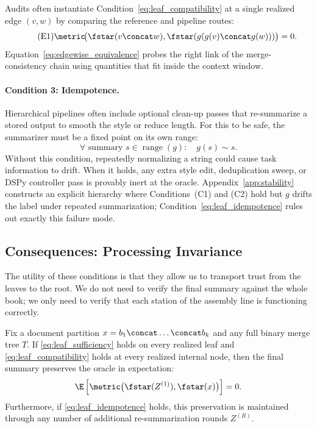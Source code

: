 \begin{remark}\label{rem:edgewise_compatibility}
Audits often instantiate Condition~\eqref{eq:leaf_compatibility} at a single realized edge $(v, w)$ by comparing the reference and pipeline routes:
\begin{equation}\tag{E1}\label{eq:edgewise_equivalence}
\metric\!\big(\fstar(v \concat w), \fstar(g(g(v) \concat g(w)))\big) = 0.
\end{equation}
Equation~\eqref{eq:edgewise_equivalence} probes the right link of the merge-consistency chain using quantities that fit inside the context window.
\end{remark}

\paragraph{Condition 3: Idempotence.}
Hierarchical pipelines often include optional clean-up passes that re-summarize a stored output to smooth the style or reduce length. For this to be safe, the summarizer must be a fixed point on its own range:
\begin{equation}\tag{C3}\label{eq:leaf_idempotence}
\forall \text{ summary } s \in \operatorname{range}(g):\quad g(s) \sim s.
\end{equation}
Without this condition, repeatedly normalizing a string could cause task information to drift. When it holds, any extra style edit, deduplication sweep, or DSPy controller pass is provably inert at the oracle. Appendix~\ref{app:stability} constructs an explicit hierarchy where Conditions~(C1) and (C2) hold but $g$ drifts the label under repeated summarization; Condition~\eqref{eq:leaf_idempotence} rules out exactly this failure mode.

\subsection{Consequences: Processing Invariance}

The utility of these conditions is that they allow us to transport trust from the leaves to the root. We do not need to verify the final summary against the whole book; we only need to verify that each station of the assembly line is functioning correctly.

\begin{theorem}\label{thm:one-pass}
Fix a document partition $x = b_1 \concat \dots \concat b_k$ and any full binary merge tree $T$. If \ref{eq:leaf_sufficiency} holds on every realized leaf and \ref{eq:leaf_compatibility} holds at every realized internal node, then the final summary preserves the oracle in expectation:
\[
\E\left[\metric\big(\fstar(Z^{(1)}), \fstar(x)\big)\right] = 0.
\]
Furthermore, if \ref{eq:leaf_idempotence} holds, this preservation is maintained through any number of additional re-summarization rounds $Z^{(R)}$.
\end{theorem}

